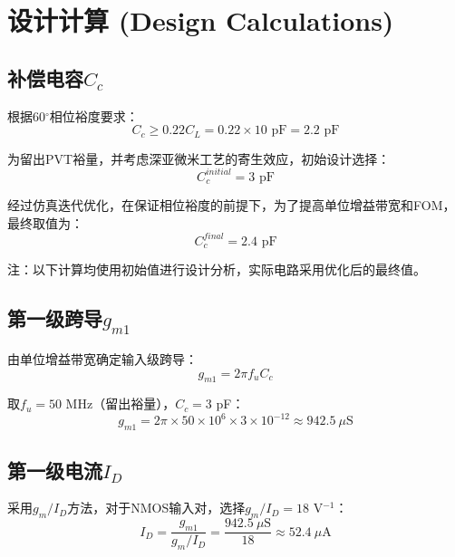 \documentclass[UTF8,12pt,a4paper]{ctexart}
\begin{document}
\section{设计计算 (Design Calculations)}

\subsection{补偿电容$C_c$}

根据60$^\circ$相位裕度要求：
\begin{equation}
C_c \geq 0.22 C_L = 0.22 \times 10\text{ pF} = 2.2\text{ pF}
\end{equation}

为留出PVT裕量，并考虑深亚微米工艺的寄生效应，初始设计选择：
\begin{equation}
C_c^{initial} = 3\text{ pF}
\end{equation}

经过仿真迭代优化，在保证相位裕度的前提下，为了提高单位增益带宽和FOM，最终取值为：
\begin{equation}
C_c^{final} = 2.4\text{ pF}
\end{equation}

注：以下计算均使用初始值进行设计分析，实际电路采用优化后的最终值。

\subsection{第一级跨导$g_{m1}$}

由单位增益带宽确定输入级跨导：
\begin{equation}
g_{m1} = 2\pi f_u C_c
\end{equation}

取$f_u = 50$ MHz（留出裕量），$C_c = 3$ pF：
\begin{equation}
g_{m1} = 2\pi \times 50\times10^6 \times 3\times10^{-12} \approx 942.5\ \mu\text{S}
\end{equation}

\subsection{第一级电流$I_D$}

采用$g_m/I_D$方法，对于NMOS输入对，选择$g_m/I_D = 18$ V$^{-1}$：
\begin{equation}
I_D = \frac{g_{m1}}{g_m/I_D} = \frac{942.5\ \mu\text{S}}{18} \approx 52.4\ \mu\text{A}
\end{equation}
\end{document}
